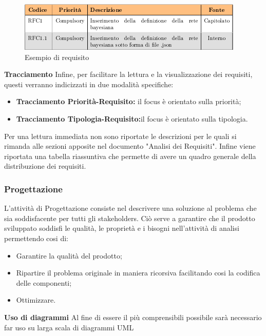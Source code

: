 	    \begin{figure}[!htbp]
	    	\centering
	    	\includegraphics{requisiti.png}
	    	\caption{Esempio di requisito}
	    \end{figure}
	    
	    \textbf{Tracciamento} Infine, per facilitare la lettura e la visualizzazione dei requisiti, questi verranno indicizzati in due modalità specifiche:
	    \begin{itemize}
	    	\item \textbf{Tracciamento Priorità-Requisito:} il focus è orientato sulla priorità;
	    	\item \textbf{Tracciamento Tipologia-Requisito:}il focus è orientato sulla tipologia.\newline
	    \end{itemize}
	    Per una lettura immediata non sono riportate le descrizioni per le quali si rimanda alle sezioni apposite nel documento "Analisi dei Requisiti".
	    Infine viene riportata una tabella riassuntiva che permette di avere un quadro generale della distribuzione dei requisiti.\newline
	    \subsubsection{Progettazione}
	    L'attività di Progettazione consiste nel descrivere una soluzione al problema che sia soddisfacente per tutti gli stakeholders\pedice. Ciò serve a garantire che il prodotto sviluppato soddisfi le qualità, le proprietà e i bisogni nell'attività di analisi permettendo cosi di:
	    \begin{itemize}
	        \item Garantire la qualità del prodotto;
	        \item Ripartire il problema originale in maniera ricorsiva facilitando cosi la codifica delle componenti;
	        \item Ottimizzare.
	    \end{itemize}	
	    \textbf{Uso di diagrammi} Al fine di essere il più comprensibili possibile sarà necessario far uso su larga scala di diagrammi UML
